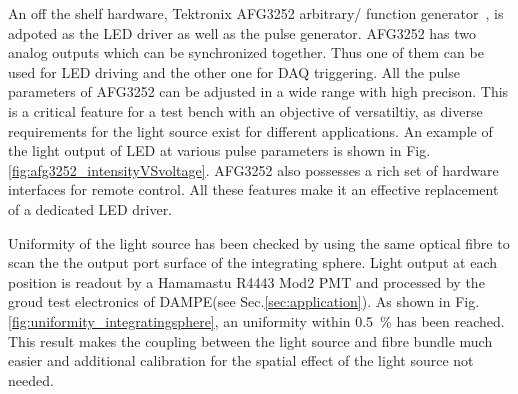 \documentclass[5p, times]{elsarticle}
\begin{document}
An off the shelf hardware, Tektronix AFG3252 arbitrary/ function generator~\cite{afg3252}, is adpoted as the LED driver as well as the pulse generator.
AFG3252 has two analog outputs which can be synchronized together.
Thus one of them can be used for LED driving and the other one for DAQ triggering.
All the pulse parameters of AFG3252 can be adjusted in a wide range with high precison.%
This is a critical feature for a test bench with an objective of versatiltiy, as diverse requirements for the light source exist for different applications.
An example of the light output of LED at various pulse parameters is shown in Fig.\ref{fig:afg3252_intensityVSvoltage}.
AFG3252 also possesses a rich set of hardware interfaces for remote control.
All these features make it an effective replacement of a dedicated LED driver. 

Uniformity of the light source has been checked by using the same optical fibre to scan the the output port surface of the integrating sphere.
Light output at each position is readout by a Hamamastu R4443 Mod2 PMT and processed by the groud test electronics of DAMPE(see Sec.\ref{sec:application}). 
As shown in Fig.\ref{fig:uniformity_integratingsphere}, an uniformity within \textpm\SI{0.5}{\percent} has been reached.
This result makes the coupling between the light source and fibre bundle much easier and additional calibration for the spatial effect of the light source not needed. 

\end{document}
